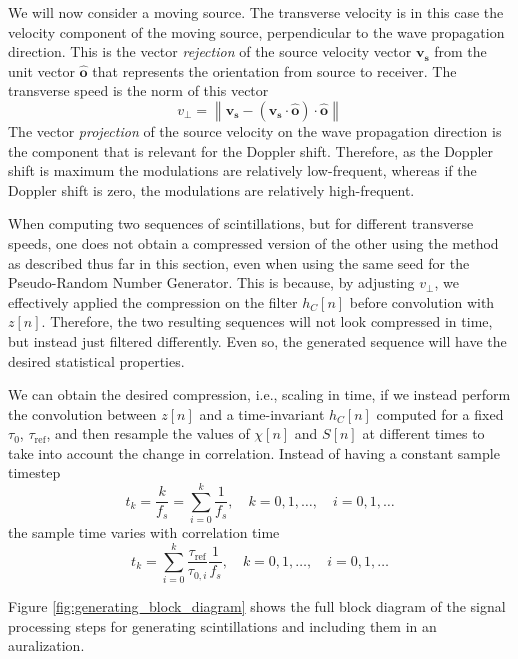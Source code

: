 We will now consider a moving source. The transverse velocity is in this case
the velocity component of the moving source, perpendicular to the wave
propagation direction. This is the vector \emph{rejection} of the source
velocity vector $\mathbf{v_s}$ from the unit vector $\mathbf{\hat{o}}$ that
represents the orientation from source to receiver. The transverse speed is the
norm of this vector
\begin{equation}
 v_{\bot} = \left\| \mathbf{v_s} - (\mathbf{v_s} \cdot  \mathbf{\hat{o}} ) \cdot \mathbf{\hat{o}}  \right\|
\end{equation}
The vector \emph{projection} of the source velocity on the wave propagation
direction is the component that is relevant for the Doppler shift. Therefore, as
the Doppler shift is maximum the modulations are relatively low-frequent,
whereas if the Doppler shift is zero, the modulations are relatively
high-frequent.

When computing two sequences of scintillations, but for different
transverse speeds, one does not obtain a compressed version of the other using
the method as described thus far in this section, even when using the same seed
for the Pseudo-Random Number Generator. This is because, by adjusting $v_{\bot}$,
we effectively applied the compression on the filter $h_C[n]$ before convolution
with $z[n]$. Therefore, the two resulting sequences will not look compressed in
time, but instead just filtered differently. Even so, the generated sequence will
have the desired statistical properties.

We can obtain the desired compression, i.e., scaling in time, if we instead
perform the convolution between $z[n]$ and a time-invariant $h_C[n]$ computed for a fixed $\tau_0$, $\tau_{\mathrm{ref}}$, and then
resample the values of $\chi[n]$ and $S[n]$ at different times to take into
account the change in correlation. Instead of having a constant sample timestep
\begin{equation}
 t_k = \frac{k}{f_s} = \sum_{i=0}^k \frac{1}{f_s}, \quad k=0, 1, \dots, \quad i=0, 1, \dots
\end{equation}
the sample time varies with correlation time
\begin{equation}
  t_k = \sum_{i=0}^k \frac{\tau_{\mathrm{ref}}}{\tau_{0,i}} \frac{1}{f_s} , \quad k=0, 1, \dots, \quad i=0, 1, \dots
\end{equation}

Figure \ref{fig:generating_block_diagram} shows the full block diagram of the signal
processing steps for generating scintillations and including them in an auralization.


